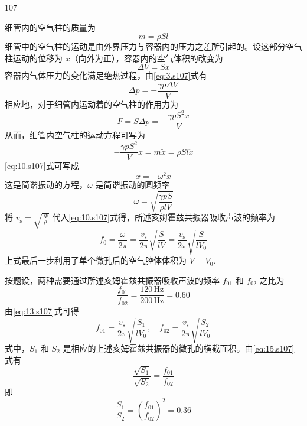 \begin{solution}{107}
\begin{subsolution}
细管内的空气柱的质量为
\begin{equation}
m = \rho S l
\label{eq:6.s107}
\end{equation}
细管中的空气柱的运动是由外界压力与容器内的压力之差所引起的。设这部分空气柱运动的位移为 $x$（向外为正），容器内的空气体积的改变为
\begin{equation}
\Delta V = S x
\label{eq:7.s107}
\end{equation}
容器内气体压力的变化满足绝热过程，由\eqref{eq:3.s107}式有
\begin{equation}
\Delta p = - \frac{\gamma p \Delta V}{V}
\label{eq:8.s107}
\end{equation}
相应地，对于细管内运动着的空气柱的作用力为
\begin{equation}
F = S \Delta p = - \frac{\gamma p S^{2} x}{V}
\label{eq:9.s107}
\end{equation}
从而，细管内空气柱的运动方程可写为
\begin{equation}
- \frac{\gamma p S^{2}}{V} x = m \ddot{x} = \rho S l \ddot{x}
\label{eq:10.s107}
\end{equation}
\eqref{eq:10.s107}式可写成
\begin{equation}
\ddot{x} = - \omega^{2} x
\label{eq:11.s107}
\end{equation}
这是简谐振动的方程，$\omega$ 是简谐振动的圆频率
\begin{equation}
\omega = \sqrt{\frac{\gamma p S}{\rho l V}}
\label{eq:12.s107}
\end{equation}
将 $v_{\mathrm{s}} = \sqrt{\frac{\gamma p}{\rho}}$ 代入\eqref{eq:10.s107}式得，所述亥姆霍兹共振器吸收声波的频率为
\begin{equation}
f_{0} = \frac{\omega}{2\pi} = \frac{v_{\mathrm{s}}}{2\pi} \sqrt{\frac{S}{l V}} = \frac{v_{\mathrm{s}}}{2\pi} \sqrt{\frac{S}{l V_{0}}}
\label{eq:13.s107}
\end{equation}
上式最后一步利用了单个微孔后的空气腔体体积为 $V = V_{0}$.
\end{subsolution}

\begin{subsolution}
按题设，两种需要通过所述亥姆霍兹共振器吸收声波的频率 $f_{01}$ 和 $f_{02}$ 之比为
\begin{equation}
\frac{f_{01}}{f_{02}} = \frac{120\,\mathrm{Hz}}{200\,\mathrm{Hz}} = 0.60
\label{eq:14.s107}
\end{equation}
由\eqref{eq:13.s107}式可得
\begin{equation}
f_{01} = \frac{v_{\mathrm{s}}}{2\pi} \sqrt{\frac{S_{1}}{l V_{0}}},\quad f_{02} = \frac{v_{\mathrm{s}}}{2\pi} \sqrt{\frac{S_{2}}{l V_{0}}}
\label{eq:15.s107}
\end{equation}
式中，$S_{1}$ 和 $S_{2}$ 是相应的上述亥姆霍兹共振器的微孔的横截面积。由\eqref{eq:15.s107}式有
\begin{equation}
\frac{\sqrt{S_{1}}}{\sqrt{S_{2}}} = \frac{f_{01}}{f_{02}}
\label{eq:16.s107}
\end{equation}
即
\begin{equation}
\frac{S_{1}}{S_{2}} = \left(\frac{f_{01}}{f_{02}}\right)^{2} = 0.36
\label{eq:17.s107}
\end{equation}
\end{subsolution}
\end{solution}